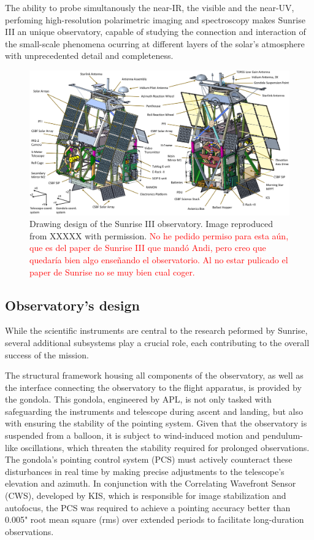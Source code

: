 The ability to probe simultanously the near-IR, the visible and the near-UV, perfoming high-resolution polarimetric imaging and spectroscopy makes Sunrise III an unique observatory, capable of studying the connection  and interaction of the small-scale phenomena ocurring at different layers of the solar's atmosphere with unprecedented detail and completeness. 

\begin{figure}[t]
    \includegraphics[width=\textwidth]{figures/TuMag/Sunrise_schematic.png}
    \caption{
      Drawing design of the Sunrise III observatory. Image reproduced from XXXXX with permission. \textcolor{red}{No he pedido permiso para esta aún, que es del paper de Sunrise III que mandó Andi, pero creo que quedaría bien algo enseñando el observatorio. Al no estar pulicado el paper de Sunrise no se muy bien cual coger.}}
      \label{fig: SunriseIII}
\end{figure}

\subsection{Observatory's design}

While the scientific instruments are central to the research peformed by Sunrise, several additional subsystems play a crucial role, each contributing to the overall success of the mission.

The structural framework housing all components of the observatory, as well as the interface connecting the observatory to the flight apparatus, is provided by the gondola. This gondola, engineered by APL, is not only tasked with safeguarding the instruments and telescope during ascent and landing, but also with ensuring the stability of the pointing system. Given that the observatory is suspended from a balloon, it is subject to wind-induced motion and pendulum-like oscillations, which threaten the stability required for prolonged observations. The gondola’s pointing control system (PCS) must actively counteract these disturbances in real time by making precise adjustments to the telescope’s elevation and azimuth. In conjunction with the Correlating Wavefront Sensor (CWS), developed by KIS, which is responsible for image stabilization and autofocus, the PCS was required to achieve a pointing accuracy better than 0.005" root mean square (rms) over extended periods to facilitate long-duration observations.

